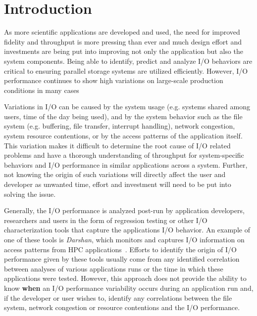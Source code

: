 \section{Introduction}
As more scientific applications are developed and used, the need for
improved fidelity and throughput is more pressing than ever and much
design effort and investments are being put into improving not only
the application but also the system components. Being able to
identify, predict and analyze I/O behaviors are critical to ensuring
parallel storage systems are utilized efficiently. However, I/O
performance continues to show high variations on large-scale
production conditions in many cases~\cite{costa2021}

Variations in I/O can be caused by the system usage (e.g. systems
shared among users, time of the day being used), and by the system
behavior such as the file system (e.g. buffering, file transfer,
interrupt handling), network congestion, system resource contentions,
or by the access patterns of the application itself. This variation
makes it difficult to determine the root cause of I/O related problems
and have a thorough understanding of throughput for system-specific
behaviors and I/O performance in similar applications across a
system. Further, not knowing the origin of such variations will
directly affect the user and developer as unwanted time, effort and
investment will need to be put into solving the issue.

Generally, the I/O performance is analyzed post-run by application
developers, researchers and users in the form of regression testing or
other I/O characterization tools that capture the applications I/O
behavior. An example of one of these tools is \emph{Darshan}, which
monitors and captures I/O information on access patterns from HPC
applications~\cite{Darshan}.
Efforts to identify the origin of I/O performance given by these tools
usually come from any identified correlation between analyses of
various applications runs or the time in which these applications were
tested. However, this approach does not provide the ability to know
\textbf{when} an I/O performance variability occurs during an
application run and, if the developer or user wishes to, identify any
correlations between the file system, network congestion or resource
contentions and the I/O performance.

